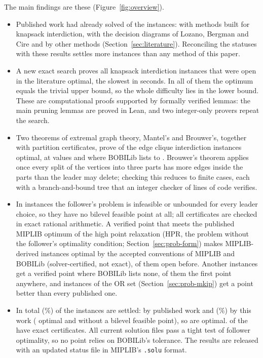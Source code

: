 \documentclass[]{spie}  %
\theoremstyle{plain}
\newcommand{\code}[1]{\texttt{#1}}
\begin{document}
The main findings are these (Figure~\ref{fig:overview}).
\begin{itemize}
\item Published work had already solved \NumLitOptimal{} of the \NumUnsolved{} instances:
\NumLitKnapsackMethods{} with methods built for knapsack
interdiction,\cite{weninger2025fast,fischetti2019interdiction} \NumLitLozano{} with the
decision diagrams of Lozano, Bergman and Cire\cite{lozano2026network} and \NumLitOther{} by other
methods (Section~\ref{sec:literature}). Reconciling the statuses with these results settles more instances
than any method of this paper.
\item A new exact search proves all \NumNewKip{} knapsack interdiction instances that were open
in the literature optimal, the slowest in \KipHardestCpu{} seconds. In all of them the optimum
equals the trivial upper bound, so the whole difficulty lies in the lower bound. These are
computational proofs supported by formally verified lemmas: the main pruning lemmas are proved
in Lean, and two integer-only provers repeat the search.
\item Two theorems of extremal graph theory, Mantel's and Brouwer's, together with partition
certificates, prove \NumNewClique{} of the \NumCliqueSet{} edge clique interdiction instances
optimal, at values \CliqueOptSeven{} and \CliqueOptNine{} where BOBILib lists \CliqueBobiMin{} to
\CliqueBobiMax{}. Brouwer's theorem applies once every split of the vertices into three parts
has more edges inside the parts than the leader may delete; checking this reduces to \NumCliquePartCases{} finite
cases, each with a branch-and-bound tree that an integer checker of \CliqueCheckerLines{} lines of
code verifies.
\item In \NumNoFeasible{} instances the follower's problem is infeasible or unbounded for every
leader choice, so they have no bilevel feasible point at all; all \NumRayExact{} certificates are
checked in exact rational arithmetic. A verified point that meets the published MIPLIB optimum of
the high point relaxation (HPR, the problem without the follower's optimality condition;
Section~\ref{sec:prob-form}) makes \NumHprOptimal{} MIPLIB-derived instances optimal by the
accepted conventions of MIPLIB and BOBILib (solver-certified, not exact), \NumHprOpen{} of them open
before. Another \NumFirstPoint{} instances get a verified point where BOBILib lists none,
\NumFirstAnywhere{} of them the first point anywhere, and \NumOrBetter{} instances of the OR set
(Section~\ref{sec:prob-mkip}) get a point better than every published one.
\item In total \NumSettled{} (\PctSettled\%) of the \NumUnsolved{} instances are settled:
\NumLitOptimal{} by published work and \NumSettledHere{} (\PctSettledHere\%) by this work
(\NumNewOptimal{} optimal and \NumNoFeasible{} without a bilevel feasible point), so
\NumOptimalNow{} are optimal. \NumClassExactSettled{} of the \NumSettledHere{} have exact
certificates. All \NumTightFiles{} current solution files pass a tight test of follower optimality,
so no point relies on BOBILib's tolerance. The results are released with an updated status file in
MIPLIB's \code{.solu} format.
\end{itemize}
\end{document}
